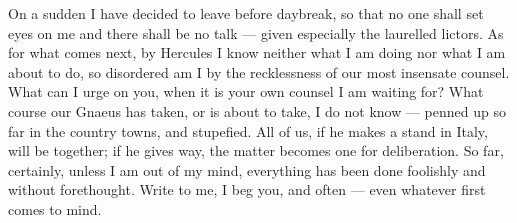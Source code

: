 

 On a sudden I have decided to leave before daybreak, so that no one shall set eyes on me and there shall be no talk --- given especially the laurelled lictors. As for what comes next, by Hercules I know neither what I am doing nor what I am about to do, so disordered am I by the recklessness of our most insensate counsel. What can I urge on you, when it is your own counsel I am waiting for? What course our Gnaeus has taken, or is about to take, I do not know --- penned up so far in the country towns, and stupefied. All of us, if he makes a stand in Italy, will be together; if he gives way, the matter becomes one for deliberation. So far, certainly, unless I am out of my mind, everything has been done foolishly and without forethought. Write to me, I beg you, and often --- even whatever first comes to mind.
